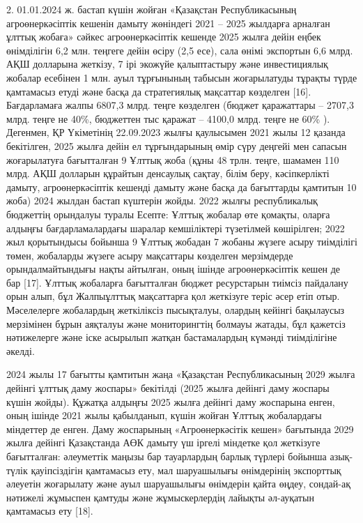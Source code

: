 \begin{multicols}{2}
2. 01.01.2024 ж. бастап күшін жойған «Қазақстан Республикасының
агроөнеркәсіптік кешенін дамыту жөніндегі 2021 -- 2025 жылдарға арналған
ұлттық жобаға» сәйкес агроөнеркәсіптік кешенде 2025 жылға дейін еңбек
өнімділігін 6,2 млн. теңгеге дейін өсіру (2,5 есе), сала өнімі экспортын
6,6 млрд. АҚШ долларына жеткізу, 7 ірі экожүйе қалыптастыру және
инвестициялық жобалар есебінен 1 млн. ауыл тұрғынының табысын
жоғарылатуды тұрақты түрде қамтамасыз етуді және басқа да стратегиялық
мақсаттар көзделген {[}16{]}. Бағдарламаға жалпы 6807,3 млрд. теңге
көзделген (бюджет қаражаттары -- 2707,3 млрд. теңге не 40\%, бюджеттен
тыс қаражат -- 4100,0 млрд. теңге не 60\% ). Дегенмен, ҚР Үкіметінің
22.09.2023 жылғы қаулысымен 2021 жылы 12 қазанда бекітілген, 2025 жылға
дейін ел тұрғындарының өмір сүру деңгейі мен сапасын жоғарылатуға
бағытталған 9 Ұлттық жоба (құны 48 трлн. теңге, шамамен 110 млрд. АҚШ
долларын құрайтын денсаулық сақтау, білім беру, кәсіпкерлікті дамыту,
агроөнеркәсіптік кешенді дамыту және басқа да бағыттарды қамтитын 10
жоба) 2024 жылдан бастап күштерін жойды. 2022 жылғы республикалық
бюджеттің орындалуы туралы Есепте: Ұлттық жобалар өте қомақты, оларға
алдыңғы бағдарламалардағы шаралар кемшіліктері түзетілмей көшірілген;
2022 жыл қорытындысы бойынша 9 Ұлттық жобадан 7 жобаны жүзеге асыру
тиімділігі төмен, жобаларды жүзеге асыру мақсаттары көзделген
мерзімдерде орындалмайтындығы нақты айтылған, оның ішінде
агроөнеркәсіптік кешен де бар {[}17{]}. Ұлттық жобаларға бағытталған
бюджет ресурстарын тиімсіз пайдалану орын алып, бұл Жалпыұлттық
мақсаттарға қол жеткізуге теріс әсер етіп отыр. Мәселелерге жобалардың
жеткіліксіз пысықталуы, олардың кейінгі бақылаусыз мерзімінен бұрын
аяқталуы және мониторингтің болмауы жатады, бұл қажетсіз нәтижелерге
және іске асырылып жатқан бастамалардың күмәнді тиімділігіне әкелді.

2024 жылы 17 бағытты қамтитын жаңа «Қазақстан Республикасының 2029 жылға
дейінгі ұлттық даму жоспары» бекітілді (2025 жылға дейінгі даму жоспары
күшін жойды). Құжатқа алдыңғы 2025 жылға дейінгі даму жоспарына енген,
оның ішінде 2021 жылы қабылданып, күшін жойған Ұлттық жобалардағы
міндеттер де енген. Даму жоспарының «Агроөнеркәсітік кешен» бағытында
2029 жылға дейінгі Қазақстанда АӨК дамыту үш іргелі міндетке қол
жеткізуге бағытталған: әлеуметтік маңызы бар тауарлардың барлық түрлері
бойынша азық-түлік қауіпсіздігін қамтамасыз ету, мал шаруашылығы
өнімдерінің экспорттық әлеуетін жоғарылату және ауыл шаруашылығы
өнімдерін қайта өңдеу, сондай-ақ нәтижелі жұмыспен қамтуды және
жұмыскерлердің лайықты әл-ауқатын қамтамасыз ету {[}18{]}.


\end{multicols}
